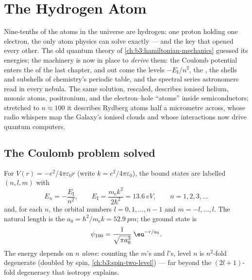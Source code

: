\chapter{The Hydrogen Atom}\label{ch:b3:hydrogen-atom}

Nine-tenths of the atoms in the universe are hydrogen: one proton
holding one electron, the only atom physics can solve exactly --- and
the key that opened every other. The old quantum theory of
\cref{ch:b3:hamiltonian-mechanics} guessed its energies; the
machinery is now in place to \emph{derive} them: the Coulomb
potential enters the  of the last chapter, and out
come the levels $-E_{\text{I}}/n^2$, the , the shells and
subshells of chemistry's periodic table, and the spectral series
astronomers read in every nebula. The same solution, rescaled,
describes ionised helium, muonic atoms, positronium, and the
electron--hole ``atoms'' inside semiconductors; stretched to $n
\approx 100$ it describes Rydberg atoms half a micrometre across,
whose radio whispers map the Galaxy's ionised clouds and whose
interactions now drive quantum computers.

\section{The Coulomb problem solved}

\begin{theorem}\label{thm:b3:hydrogen-atom:levels}
For $V(r) = -e^2/4\pi\varepsilon_0 r$ (write $k = e^2/4\pi
\varepsilon_0$), the bound states are labelled $(n, l, m)$ with
\[
E_n = -\frac{E_{\text{I}}}{n^2} , \qquad
E_{\text{I}} = \frac{m_{\text{e}}k^2}{2\hbar^2} = \qty{13.6}{eV} ,
\qquad n = 1, 2, 3, \dots
\]
and, for each $n$, the orbital numbers $l = 0, 1, \dots, n-1$ and
$m = -l, \dots, l$. The natural length is the  $a_0 =
\hbar^2/m_{\text{e}}k = \qty{52.9}{pm}$; the ground state is
\[
\psi_{100} = \frac{1}{\sqrt{\pi a_0^3}}\;\eu^{-r/a_0} .
\]
The energy depends on $n$ \emph{alone}: counting the $m$'s and
$l$'s, level $n$ is $n^2$-fold degenerate (doubled by spin,
\cref{ch:b3:spin-two-level}) --- far beyond the $(2l+1)$-fold
degeneracy that isotropy explains.
\end{theorem}

